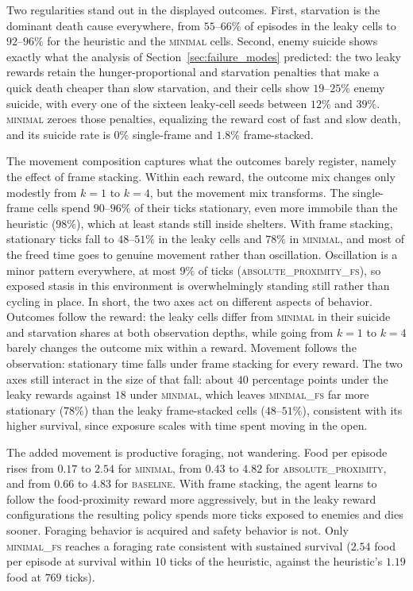 \documentclass[12pt,a4paper,titlepage]{article}
\begin{document}
Two regularities stand out in the displayed outcomes. First, starvation is the dominant death cause everywhere, from $55$--$66\%$ of episodes in the leaky cells to $92$--$96\%$ for the heuristic and the \textsc{minimal} cells. Second, enemy suicide shows exactly what the analysis of Section~\ref{sec:failure_modes} predicted: the two leaky rewards retain the hunger-proportional and starvation penalties that make a quick death cheaper than slow starvation, and their cells show $19$--$25\%$ enemy suicide, with every one of the sixteen leaky-cell seeds between $12\%$ and $39\%$. \textsc{minimal} zeroes those penalties, equalizing the reward cost of fast and slow death, and its suicide rate is $0\%$ single-frame and $1.8\%$ frame-stacked.

The movement composition captures what the outcomes barely register, namely the effect of frame stacking. Within each reward, the outcome mix changes only modestly from $k=1$ to $k=4$, but the movement mix transforms. The single-frame cells spend $90$--$96\%$ of their ticks stationary, even more immobile than the heuristic ($98\%$), which at least stands still inside shelters. With frame stacking, stationary ticks fall to $48$--$51\%$ in the leaky cells and $78\%$ in \textsc{minimal}, and most of the freed time goes to genuine movement rather than oscillation. Oscillation is a minor pattern everywhere, at most $9\%$ of ticks (\textsc{absolute\_proximity\_fs}), so exposed stasis in this environment is overwhelmingly standing still rather than cycling in place. In short, the two axes act on different aspects of behavior. Outcomes follow the reward: the leaky cells differ from \textsc{minimal} in their suicide and starvation shares at both observation depths, while going from $k=1$ to $k=4$ barely changes the outcome mix within a reward. Movement follows the observation: stationary time falls under frame stacking for every reward. The two axes still interact in the size of that fall: about $40$ percentage points under the leaky rewards against $18$ under \textsc{minimal}, which leaves \textsc{minimal\_fs} far more stationary ($78\%$) than the leaky frame-stacked cells ($48$--$51\%$), consistent with its higher survival, since exposure scales with time spent moving in the open.

The added movement is productive foraging, not wandering. Food per episode rises from $0.17$ to $2.54$ for \textsc{minimal}, from $0.43$ to $4.82$ for \textsc{absolute\_proximity}, and from $0.66$ to $4.83$ for \textsc{baseline}. With frame stacking, the agent learns to follow the food-proximity reward more aggressively, but in the leaky reward configurations the resulting policy spends more ticks exposed to enemies and dies sooner. Foraging behavior is acquired and safety behavior is not. Only \textsc{minimal\_fs} reaches a foraging rate consistent with sustained survival ($2.54$ food per episode at survival within $10$ ticks of the heuristic, against the heuristic's $1.19$ food at $769$ ticks).
\end{document}
